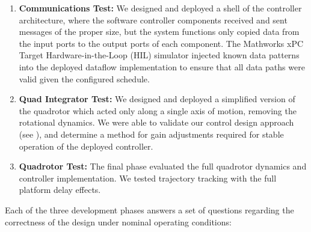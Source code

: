\begin{enumerate}
\item {\bf Communications Test:} We designed and deployed a shell
of the controller architecture, where the software controller components
received and sent messages of the proper size, but the system functions only
copied data from the input ports to the output ports of each component.  The 
Mathworks xPC Target Hardware-in-the-Loop (HIL) simulator injected known 
data patterns into the
deployed dataflow implementation to ensure that all data paths were valid
given the configured schedule.
\item {\bf Quad Integrator Test:} We designed and deployed a simplified
version of the quadrotor which acted only along a single axis of motion,
removing the rotational dynamics.  We were able to validate our control
design approach (see \cite{pass:validation}), and determine a method for 
gain adjustments required for stable operation of the deployed controller. 
\item {\bf Quadrotor Test:} The final phase evaluated the full quadrotor
dynamics and controller implementation.  We tested trajectory tracking 
with the full platform delay effects.
\end{enumerate}

Each of the three development phases answers a set of questions regarding
the correctness of the design under nominal operating conditions:


